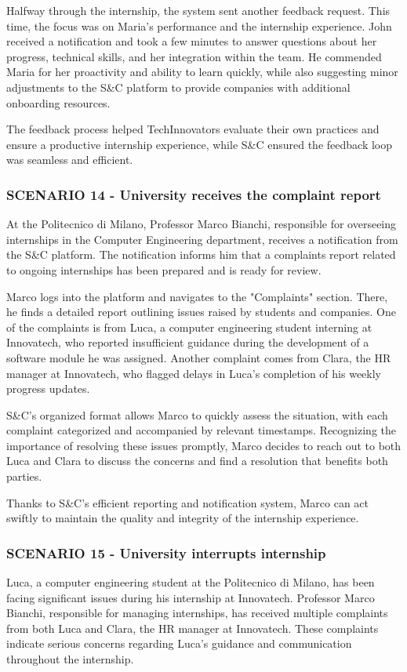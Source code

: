 Halfway through the internship, the system sent another feedback request. This time, the focus
was on Maria’s performance and the internship experience. John received a notification and took
a few minutes to answer questions about her progress, technical skills, and her integration within
the team. He commended Maria for her proactivity and ability to learn quickly, while also suggesting
minor adjustments to the S\&C platform to provide companies with additional onboarding resources.  

The feedback process helped TechInnovators evaluate their own practices and ensure a productive
internship experience, while S\&C ensured the feedback loop was seamless and efficient.
\subsubsection{SCENARIO 14 - University receives the complaint report}
At the Politecnico di Milano, Professor Marco Bianchi, responsible for overseeing internships
in the Computer Engineering department, receives a notification from the S\&C platform.
The notification informs him that a complaints report related to ongoing internships has
been prepared and is ready for review.  

Marco logs into the platform and navigates to the "Complaints" section. There, he finds
a detailed report outlining issues raised by students and companies. One of the complaints
is from Luca, a computer engineering student interning at Innovatech, who reported insufficient
guidance during the development of a software module he was assigned. Another complaint comes
from Clara, the HR manager at Innovatech, who flagged delays in Luca’s completion of his weekly
progress updates.  

S\&C’s organized format allows Marco to quickly assess the situation, with each complaint
categorized and accompanied by relevant timestamps. Recognizing the importance of resolving
these issues promptly, Marco decides to reach out to both Luca and Clara to discuss the concerns
and find a resolution that benefits both parties.  

Thanks to S\&C’s efficient reporting and notification system, Marco can act swiftly to
maintain the quality and integrity of the internship experience.
\subsubsection{SCENARIO 15 - University interrupts internship}
Luca, a computer engineering student at the Politecnico di Milano, has been facing significant
issues during his internship at Innovatech. Professor Marco Bianchi, responsible for managing
internships, has received multiple complaints from both Luca and Clara, the HR manager at Innovatech.
These complaints indicate serious concerns regarding Luca's guidance and communication throughout
the internship.  

